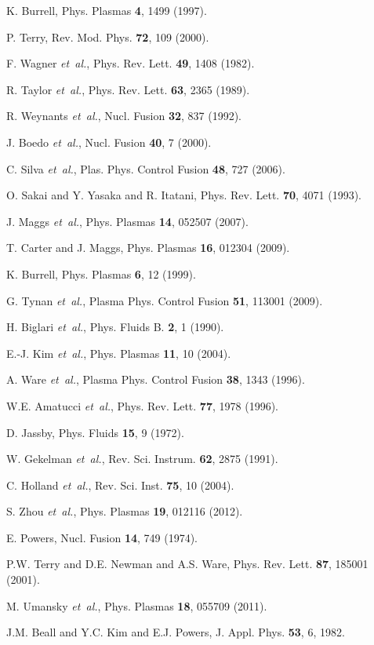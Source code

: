 \documentclass[aip,pop,amsmath,amssymb,preprint,superscriptaddress]{revtex4-1} %
\begin{document}
\providecommand{\noopsort}[1]{}\providecommand{\singleletter}[1]{#1}%
\begin{thebibliography}{10}

K. Burrell, Phys. Plasmas {\bf 4},  1499  (1997).

P. Terry, Rev. Mod. Phys. {\bf 72},  109  (2000).

F. Wagner {\it et~al.}, Phys. Rev. Lett. {\bf 49},  1408  (1982).

R. Taylor {\it et~al.}, Phys. Rev. Lett. {\bf 63},  2365  (1989).

R. Weynants {\it et~al.}, Nucl. Fusion {\bf 32},  837  (1992).

J. Boedo {\it et~al.}, Nucl. Fusion {\bf 40},  7  (2000).

C. Silva {\it et~al.}, Plas. Phys. Control Fusion {\bf 48},  727  (2006).

O. Sakai and Y. Yasaka and R. Itatani, Phys. Rev. Lett. {\bf 70},  4071 (1993).

J. Maggs {\it et~al.}, Phys. Plasmas {\bf 14},  052507  (2007).

T. Carter and J. Maggs, Phys. Plasmas {\bf 16},  012304  (2009).

K. Burrell, Phys. Plasmas {\bf 6},  12  (1999).

G. Tynan {\it et~al.}, Plasma Phys. Control Fusion {\bf 51}, 113001  (2009).

H. Biglari {\it et~al.}, Phys. Fluids B. {\bf 2},  1  (1990).

E.-J. Kim {\it et~al.}, Phys. Plasmas {\bf 11},  10  (2004).

A. Ware {\it et~al.}, Plasma Phys. Control Fusion
  {\bf 38},  1343  (1996).

W.E. Amatucci {\it et~al.}, Phys. Rev. Lett. {\bf 77},  1978  (1996).

D. Jassby, Phys. Fluids {\bf 15},  9  (1972).

W. Gekelman {\it et~al.}, Rev. Sci. Instrum. {\bf 62},  2875  (1991).

C. Holland {\it et~al.}, Rev. Sci. Inst. {\bf 75},  10
  (2004).

S. Zhou {\it et~al.}, Phys. Plasmas {\bf 19},  012116  (2012).

E. Powers, Nucl. Fusion {\bf 14},  749  (1974).

P.W. Terry and D.E. Newman and A.S. Ware, Phys. Rev. Lett. {\bf 87}, 185001  (2001).

M. Umansky {\it et~al.}, Phys. Plasmas {\bf 18},  055709  (2011).

J.M. Beall and Y.C. Kim and E.J. Powers, J. Appl. Phys. {\bf 53}, 6, {1982}.

\end{thebibliography}
\end{document}
